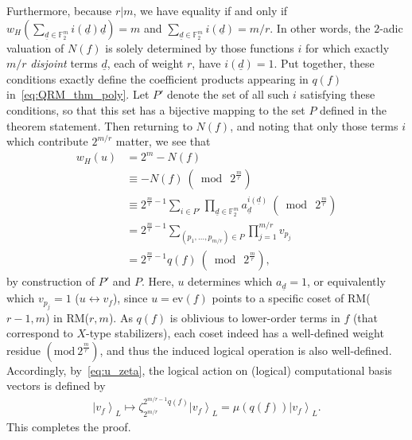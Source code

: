 \documentclass[twoside,romanappendices]{IEEEtran}
\newcommand{\ket}[1]{\left\lvert #1 \right\rangle}
\newcommand{\vecnot}[1]{\underline{#1}}
\begin{document}
Furthermore, because $r|m$, we have equality if and only if $w_H\left( \sum_{\vecnot{d} \in \mathbb{F}_2^m} i(\vecnot{d}) \vecnot{d}\right) = m$ and $\sum_{\vecnot{d} \in \mathbb{F}_2^m} i(\vecnot{d}) = m/r$.  
In other words, the $2$-adic valuation of $N(f)$ is solely determined by those functions $i$ for which exactly $m/r$ \emph{disjoint} terms $\vecnot{d}$, each of weight $r$, have $i(\vecnot{d}) = 1$.
Put together, these conditions exactly define the coefficient products appearing in $q(f)$ in~\eqref{eq:QRM_thm_poly}.  
Let $P'$ denote the set of all such $i$ satisfying these conditions, so that this set has a bijective mapping to the set $P$ defined in the theorem statement.  
Then returning to $N(f)$, and noting that only those terms $i$ which contribute $2^{m/r}$ matter, we see that 
\begin{align}
w_H(u) & = 2^m - N(f) \\
%
  & \equiv - N(f) \ (\bmod\ 2^{\frac{m}{r}}) \\
%
  & \equiv 2^{\frac{m}{r}-1} \sum_{i \in P'} \prod_{\vecnot{d} \in \mathbb{F}_2^m} a_{\vecnot{d}}^{i(\vecnot{d})}\ (\bmod\ 2^{\frac{m}{r}}) \\
%
  & = 2^{\frac{m}{r}-1} \sum_{(p_1,\ldots,p_{m/r}) \in P} \prod_{j = 1}^{m/r} v_{p_j} \\
%
\label{eq:quasitransversal}
  & = 2^{\frac{m}{r}-1} q(f)\ (\bmod\ 2^{\frac{m}{r}}),
\end{align}
by construction of $P'$ and $P$.  
Here, $u$ determines which $a_{\vecnot{d}} = 1$, or equivalently which $v_{p_j} = 1$ ($u \leftrightarrow v_f$), since $u = \text{ev}(f)$ points to a specific coset of RM($r-1,m$) in RM($r,m$).
As $q(f)$ is oblivious to lower-order terms in $f$ (that correspond to $X$-type stabilizers), each coset indeed has a well-defined weight residue $(\text{mod}\ 2^{\frac{m}{r}})$, and thus the induced logical operation is also well-defined. 
Accordingly, by~\eqref{eq:u_zeta}, the logical action on (logical) computational basis vectors is defined by 
\begin{align}
\ket{v_f}_L \mapsto \zeta_{2^{m/r}}^{2^{m/r - 1} q(f)} \ket{v_f}_L = \mu(q(f)) \ket{v_f}_L.
\end{align}
This completes the proof.   \hfill \IEEEQEDhere
\end{document}
